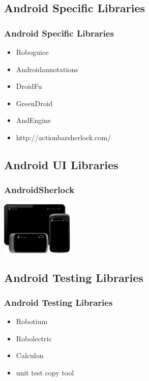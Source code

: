 \documentclass{beamer}
\begin{document}
\subsection{Android Specific Libraries}

\begin{frame}
  \frametitle{Android Specific Libraries}
  \begin{itemize}
    \item<1->Roboguice 
    \item<2->Androidannotations
    \item<3->DroidFu
    \item<4->GreenDroid
    \item<5->AndEngine
    \item<6->http://actionbarsherlock.com/
  \end{itemize}
\end{frame}

\subsection{Android UI Libraries}

\begin{frame}
  \frametitle{AndroidSherlock}
  \begin{center}
  \includegraphics[height=1.0in]{androidsherlock.png}
  \end{center}
\end{frame}

\subsection{Android Testing Libraries}

\begin{frame}
  \frametitle{Android Testing Libraries}
  \begin{itemize}
    \item<1->Robotium 
    \item<2->Robolectric
    \item<3->Calculon
    \item<4->unit test copy tool
  \end{itemize}
\end{frame}
\end{document}
